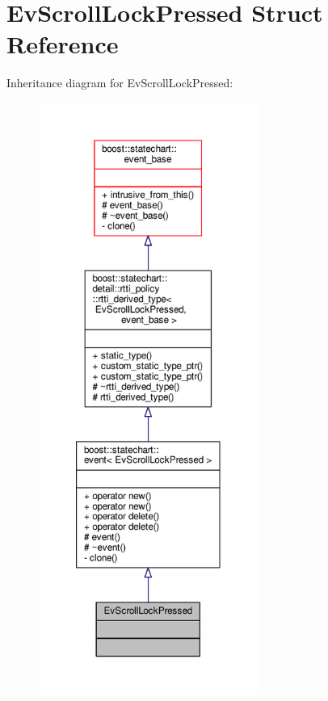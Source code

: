 \hypertarget{struct_ev_scroll_lock_pressed}{}\section{Ev\+Scroll\+Lock\+Pressed Struct Reference}
\label{struct_ev_scroll_lock_pressed}


Inheritance diagram for Ev\+Scroll\+Lock\+Pressed\+:
\nopagebreak
\begin{figure}[H]
\begin{center}
\leavevmode
\includegraphics[height=550pt]{struct_ev_scroll_lock_pressed__inherit__graph}
\end{center}
\end{figure}


